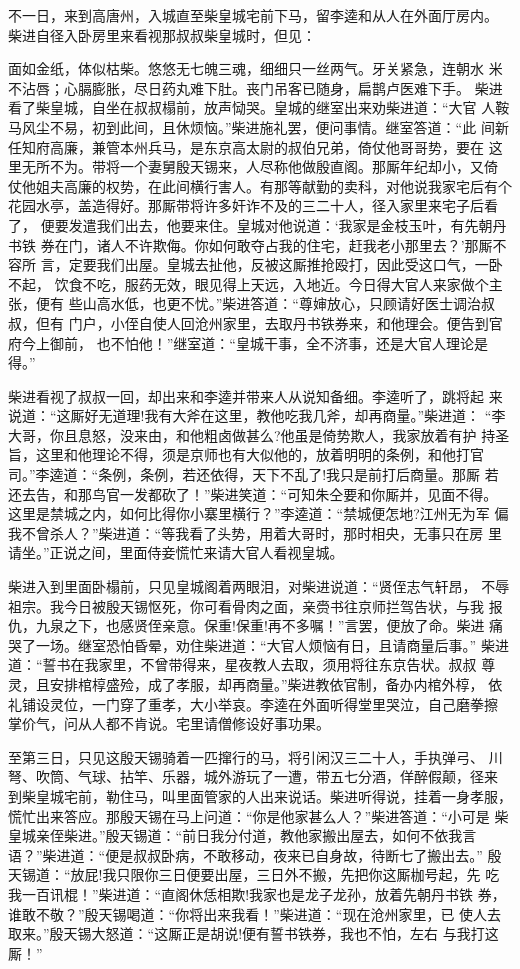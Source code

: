 不一日，来到高唐州，入城直至柴皇城宅前下马，留李逵和从人在外面厅房内。
柴进自径入卧房里来看视那叔叔柴皇城时，但见：

面如金纸，体似枯柴。悠悠无七魄三魂，细细只一丝两气。牙关紧急，连朝水
米不沾唇；心膈膨胀，尽日药丸难下肚。丧门吊客已随身，扁鹊卢医难下手。
柴进看了柴皇城，自坐在叔叔榻前，放声恸哭。皇城的继室出来劝柴进道：“大官
人鞍马风尘不易，初到此间，且休烦恼。”柴进施礼罢，便问事情。继室答道：“此
间新任知府高廉，兼管本州兵马，是东京高太尉的叔伯兄弟，倚仗他哥哥势，要在
这里无所不为。带将一个妻舅殷天锡来，人尽称他做殷直阁。那厮年纪却小，又倚
仗他姐夫高廉的权势，在此间横行害人。有那等献勤的卖科，对他说我家宅后有个
花园水亭，盖造得好。那厮带将许多奸诈不及的三二十人，径入家里来宅子后看了，
便要发遣我们出去，他要来住。皇城对他说道：‘我家是金枝玉叶，有先朝丹书铁
券在门，诸人不许欺侮。你如何敢夺占我的住宅，赶我老小那里去？’那厮不容所
言，定要我们出屋。皇城去扯他，反被这厮推抢殴打，因此受这口气，一卧不起，
饮食不吃，服药无效，眼见得上天远，入地近。今日得大官人来家做个主张，便有
些山高水低，也更不忧。”柴进答道：“尊婶放心，只顾请好医士调治叔叔，但有
门户，小侄自使人回沧州家里，去取丹书铁券来，和他理会。便告到官府今上御前，
也不怕他！”继室道：“皇城干事，全不济事，还是大官人理论是得。”

柴进看视了叔叔一回，却出来和李逵并带来人从说知备细。李逵听了，跳将起
来说道：“这厮好无道理!我有大斧在这里，教他吃我几斧，却再商量。”柴进道：
“李大哥，你且息怒，没来由，和他粗卤做甚么?他虽是倚势欺人，我家放着有护
持圣旨，这里和他理论不得，须是京师也有大似他的，放着明明的条例，和他打官
司。”李逵道：“条例，条例，若还依得，天下不乱了!我只是前打后商量。那厮
若还去告，和那鸟官一发都砍了！”柴进笑道：“可知朱仝要和你厮并，见面不得。
这里是禁城之内，如何比得你小寨里横行？”李逵道：“禁城便怎地?江州无为军
偏我不曾杀人？”柴进道：“等我看了头势，用着大哥时，那时相央，无事只在房
里请坐。”正说之间，里面侍妾慌忙来请大官人看视皇城。

柴进入到里面卧榻前，只见皇城阁着两眼泪，对柴进说道：“贤侄志气轩昂，
不辱祖宗。我今日被殷天锡怄死，你可看骨肉之面，亲赍书往京师拦驾告状，与我
报仇，九泉之下，也感贤侄亲意。保重!保重!再不多嘱！”言罢，便放了命。柴进
痛哭了一场。继室恐怕昏晕，劝住柴进道：“大官人烦恼有日，且请商量后事。”
柴进道：“誓书在我家里，不曾带得来，星夜教人去取，须用将往东京告状。叔叔
尊灵，且安排棺椁盛殓，成了孝服，却再商量。”柴进教依官制，备办内棺外椁，
依礼铺设灵位，一门穿了重孝，大小举哀。李逵在外面听得堂里哭泣，自己磨拳擦
掌价气，问从人都不肯说。宅里请僧修设好事功果。

至第三日，只见这殷天锡骑着一匹撺行的马，将引闲汉三二十人，手执弹弓、
川弩、吹筒、气球、拈竿、乐器，城外游玩了一遭，带五七分酒，佯醉假颠，径来
到柴皇城宅前，勒住马，叫里面管家的人出来说话。柴进听得说，挂着一身孝服，
慌忙出来答应。那殷天锡在马上问道：“你是他家甚么人？”柴进答道：“小可是
柴皇城亲侄柴进。”殷天锡道：“前日我分付道，教他家搬出屋去，如何不依我言
语？”柴进道：“便是叔叔卧病，不敢移动，夜来已自身故，待断七了搬出去。”
殷天锡道：“放屁!我只限你三日便要出屋，三日外不搬，先把你这厮枷号起，先
吃我一百讯棍！”柴进道：“直阁休恁相欺!我家也是龙子龙孙，放着先朝丹书铁
券，谁敢不敬？”殷天锡喝道：“你将出来我看！”柴进道：“现在沧州家里，已
使人去取来。”殷天锡大怒道：“这厮正是胡说!便有誓书铁券，我也不怕，左右
与我打这厮！”

